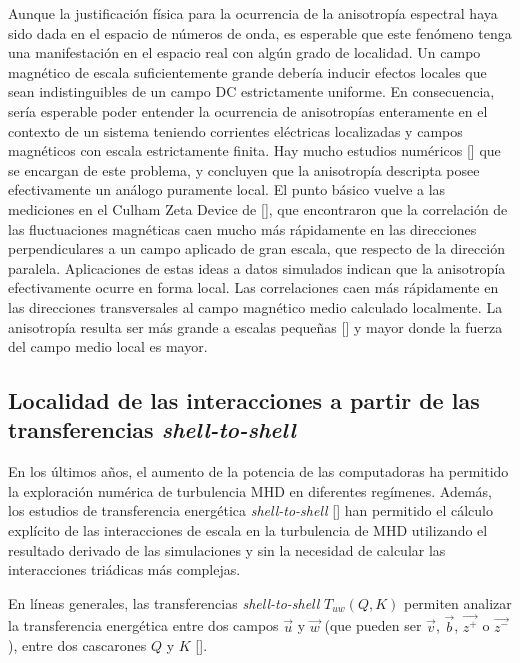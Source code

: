 Aunque la justificación física para la ocurrencia de la anisotropía
espectral haya sido dada en el espacio de números de onda, es
esperable que este fenómeno tenga una manifestación en el espacio real
con algún grado de localidad. Un campo magnético de escala
suficientemente grande debería inducir efectos locales que sean
indistinguibles de un campo DC estrictamente uniforme. En
consecuencia, sería esperable poder entender la ocurrencia de
anisotropías enteramente en el contexto de un sistema teniendo
corrientes eléctricas localizadas y campos magnéticos con escala
estrictamente finita. Hay mucho estudios numéricos
[\cite{cho_anisotropy_2000, milano_local_2001}] que se encargan de
este problema, y concluyen que la anisotropía descripta posee
efectivamente un análogo puramente local. El punto básico vuelve a las
mediciones en el Culham Zeta Device de
[\cite{robinson_structure_1971}], que encontraron que la correlación
de las fluctuaciones magnéticas caen mucho más rápidamente en las
direcciones perpendiculares a un campo aplicado de gran escala, que
respecto de la dirección paralela. Aplicaciones de estas ideas a datos
simulados indican que la anisotropía efectivamente ocurre en forma
local. Las correlaciones caen más rápidamente en las direcciones
transversales al campo magnético medio calculado localmente. La
anisotropía resulta ser más grande a escalas pequeñas
[\cite{cho_anisotropy_2000}] y mayor donde la fuerza del campo medio
local es mayor.

\subsection{Localidad de las interacciones a partir de las transferencias \emph{shell-to-shell}}
En los últimos años, el aumento de la potencia de las computadoras ha
permitido la exploración numérica de turbulencia MHD en diferentes
regímenes. Además, los estudios de transferencia energética
\textit{shell-to-shell} [\cite{alexakis_shell_2005, dar_energy_2001,
  debliquy_energy_2005}] han permitido el cálculo explícito de las
interacciones de escala en la turbulencia de MHD utilizando el
resultado derivado de las simulaciones y sin la necesidad de calcular
las interacciones triádicas más complejas.

En líneas generales, las transferencias \textit{shell-to-shell}
$T_{uw}(Q, K)$ permiten analizar la transferencia energética
entre dos campos $\vec{u}$ y $\vec{w}$ (que pueden ser $\vec{v}$,
$\vec{b}$, $\vec{z^+}$ o $\vec{z^-}$), entre dos cascarones $Q$ y $K$
[\cite{mininni_scale_2011}].

